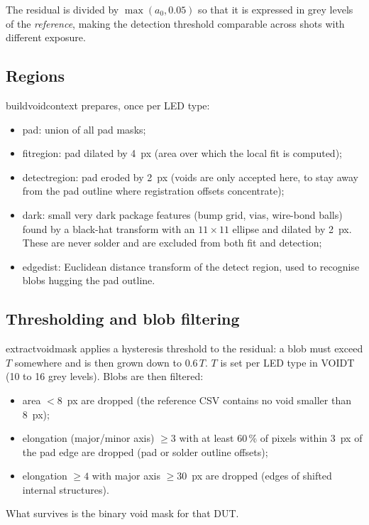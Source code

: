 \documentclass[11pt,a4paper]{article}
\newcommand{\code}[1]{{\ttfamily\def\_{\textunderscore\allowbreak}#1}}
\begin{document}
The residual is divided by $\max(a_0, 0.05)$ so that it is expressed in grey levels of the
\emph{reference}, making the detection threshold comparable across shots with different
exposure.

\subsection{Regions}

\code{build\_void\_context} prepares, once per LED type:
\begin{itemize}[nosep]
  \item \code{pad}: union of all pad masks;
  \item \code{fit\_region}: pad dilated by 4~px (area over which the local fit is computed);
  \item \code{detect\_region}: pad eroded by 2~px (voids are only accepted here, to stay away
        from the pad outline where registration offsets concentrate);
  \item \code{dark}: small very dark package features (bump grid, vias, wire-bond balls) found
        by a black-hat transform with an $11\times11$ ellipse and dilated by 2~px. These are
        never solder and are excluded from both fit and detection;
  \item \code{edge\_dist}: Euclidean distance transform of the detect region, used to recognise
        blobs hugging the pad outline.
\end{itemize}

\subsection{Thresholding and blob filtering}

\code{extract\_void\_mask} applies a hysteresis threshold to the residual: a blob must exceed
$T$ somewhere and is then grown down to $0.6\,T$. $T$ is set per LED type in \code{VOID\_T}
(10 to 16 grey levels). Blobs are then filtered:
\begin{itemize}[nosep]
  \item area $< 8$~px are dropped (the reference CSV contains no void smaller than 8~px);
  \item elongation (major/minor axis) $\geq 3$ with at least 60\,\% of pixels within 3~px of the
        pad edge are dropped (pad or solder outline offsets);
  \item elongation $\geq 4$ with major axis $\geq 30$~px are dropped (edges of shifted internal
        structures).
\end{itemize}
What survives is the binary void mask for that DUT.
\end{document}
